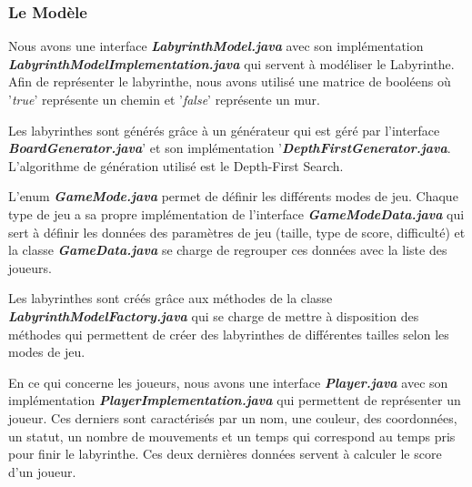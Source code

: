 \subsubsection{Le Modèle}
\label{subsubsec:modele}

Nous avons une interface \textbf{\textit{LabyrinthModel.java}} avec son implémentation
\textbf{\textit{LabyrinthModelImplementation.java}} qui servent à modéliser le Labyrinthe.
Afin de représenter le labyrinthe, nous avons utilisé une matrice de booléens
où '\textit{true}' représente un chemin et '\textit{false}' représente un mur.

Les labyrinthes sont générés grâce à un générateur qui est géré par
l'interface \textbf{\textit{BoardGenerator.java}}' et son implémentation '\textbf{\textit{DepthFirstGenerator.java}}.
L'algorithme de génération utilisé est le Depth-First Search.

L'enum \textbf{\textit{GameMode.java}} permet de définir les différents modes de jeu.
Chaque type de jeu a sa propre implémentation de l'interface \textbf{\textit{GameModeData.java}}
qui sert à définir les données des paramètres de jeu
(taille, type de score, difficulté) et la classe \textbf{\textit{GameData.java}} se charge de
regrouper ces données avec la liste des joueurs.

Les labyrinthes sont créés grâce aux méthodes de la classe
\textbf{\textit{LabyrinthModelFactory.java}} qui se charge de mettre à disposition des méthodes
qui permettent de créer des labyrinthes de différentes tailles selon les modes
de jeu.

En ce qui concerne les joueurs, nous avons une interface \textbf{\textit{Player.java}} avec son
implémentation \textbf{\textit{PlayerImplementation.java}} qui permettent de représenter un
joueur. Ces derniers sont caractérisés par un nom, une couleur, des coordonnées, un
statut, un nombre de mouvements et un temps qui correspond au temps pris pour finir le labyrinthe.
Ces deux dernières données servent à calculer le score d'un joueur.

